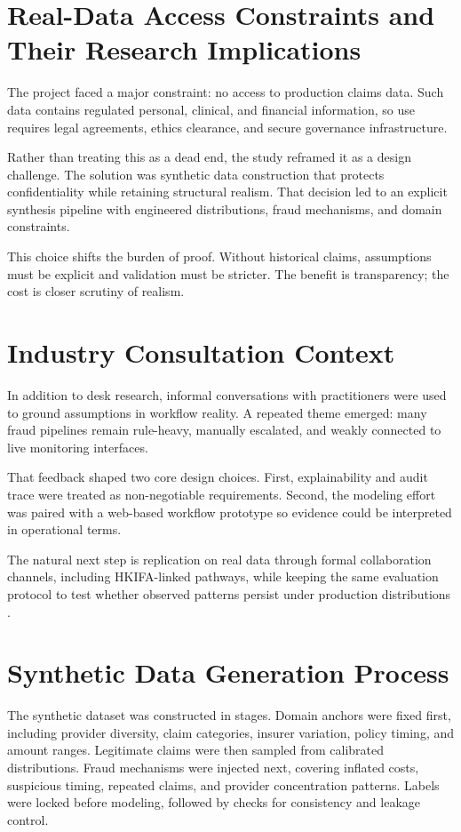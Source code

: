 \documentclass[12pt,a4paper]{report}
\begin{document}
\section{Real-Data Access Constraints and Their Research Implications}
The project faced a major constraint: no access to production claims data. Such data contains regulated personal, clinical, and financial information, so use requires legal agreements, ethics clearance, and secure governance infrastructure.

Rather than treating this as a dead end, the study reframed it as a design challenge. The solution was synthetic data construction that protects confidentiality while retaining structural realism. That decision led to an explicit synthesis pipeline with engineered distributions, fraud mechanisms, and domain constraints.

This choice shifts the burden of proof. Without historical claims, assumptions must be explicit and validation must be stricter. The benefit is transparency; the cost is closer scrutiny of realism.

\section{Industry Consultation Context}
In addition to desk research, informal conversations with practitioners were used to ground assumptions in workflow reality. A repeated theme emerged: many fraud pipelines remain rule-heavy, manually escalated, and weakly connected to live monitoring interfaces.

That feedback shaped two core design choices. First, explainability and audit trace were treated as non-negotiable requirements. Second, the modeling effort was paired with a web-based workflow prototype so evidence could be interpreted in operational terms.

The natural next step is replication on real data through formal collaboration channels, including HKIFA-linked pathways, while keeping the same evaluation protocol to test whether observed patterns persist under production distributions \citep{hkifa2023}.

\section{Synthetic Data Generation Process}
The synthetic dataset was constructed in stages. Domain anchors were fixed first, including provider diversity, claim categories, insurer variation, policy timing, and amount ranges. Legitimate claims were then sampled from calibrated distributions. Fraud mechanisms were injected next, covering inflated costs, suspicious timing, repeated claims, and provider concentration patterns. Labels were locked before modeling, followed by checks for consistency and leakage control.
\end{document}
